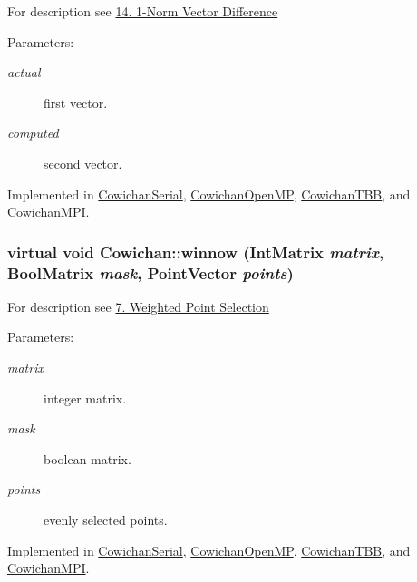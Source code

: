 For description see \hyperlink{index_vecdiff_sec}{14. 1-Norm Vector Difference} \begin{Desc}
\item[Parameters:]
\begin{description}
\item[{\em actual}]first vector. \item[{\em computed}]second vector. \end{description}
\end{Desc}


Implemented in \hyperlink{class_cowichan_serial_34b75a2084051b3677071bb3c334d1f4}{CowichanSerial}, \hyperlink{class_cowichan_open_m_p_92aa23ed47da0a5a3b43416ab08199b3}{CowichanOpenMP}, \hyperlink{class_cowichan_t_b_b_28c976743df231fd183e4db9306050b1}{CowichanTBB}, and \hyperlink{class_cowichan_m_p_i_c5470a2876efecf843b19c37c21ecf19}{CowichanMPI}.\hypertarget{class_cowichan_13d60e06ced3b5da79d62c133ce82337}{
\subsubsection[{winnow}]{\setlength{\rightskip}{0pt plus 5cm}virtual void Cowichan::winnow ({\bf IntMatrix} {\em matrix}, \/  {\bf BoolMatrix} {\em mask}, \/  {\bf PointVector} {\em points})}}
\label{class_cowichan_13d60e06ced3b5da79d62c133ce82337}


For description see \hyperlink{index_winnow_sec}{7. Weighted Point Selection} \begin{Desc}
\item[Parameters:]
\begin{description}
\item[{\em matrix}]integer matrix. \item[{\em mask}]boolean matrix. \item[{\em points}]evenly selected points. \end{description}
\end{Desc}


Implemented in \hyperlink{class_cowichan_serial_33daca65431f792c2f4f0e7f8d29fa01}{CowichanSerial}, \hyperlink{class_cowichan_open_m_p_4a518f2b5590d4acd670f333471a380a}{CowichanOpenMP}, \hyperlink{class_cowichan_t_b_b_77178470ef780e0505137dc1d22a85a2}{CowichanTBB}, and \hyperlink{class_cowichan_m_p_i_9be48d86fc51ce13ef79d5fe2c8a16e0}{CowichanMPI}.

